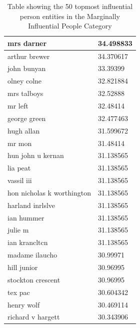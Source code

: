 \documentclass[letterpaper,11pt]{report}
\begin{document}
\begin{table}[h]
\begin{tabular}{|l|l|}
mrs darner                 & 34.498833 \\ \hline
arthur brewer              & 34.370617 \\ \hline
john bunyan                & 33.39399  \\ \hline
olney colne                & 32.821884 \\ \hline
mrs talboys                & 32.52888  \\ \hline
mr left                    & 32.48414  \\ \hline
george green               & 32.477463 \\ \hline
hugh allan                 & 31.599672 \\ \hline
mr mon                     & 31.48414  \\ \hline
hun john u kernan          & 31.138565 \\ \hline
lia peat                   & 31.138565 \\ \hline
vassil iii                 & 31.138565 \\ \hline
hon nicholas k worthington & 31.138565 \\ \hline
harland inrlslve           & 31.138565 \\ \hline
ian hummer                 & 31.138565 \\ \hline
julie m                    & 31.138565 \\ \hline
ian krancltcn              & 31.138565 \\ \hline
madame ilaucho             & 30.99971  \\ \hline
hill junior                & 30.96995  \\ \hline
stockton crescent          & 30.96995  \\ \hline
tex pac                    & 30.604342 \\ \hline
henry wolf                 & 30.469114 \\ \hline
richard v hargett          & 30.343906 \\ \hline
\end{tabular}
\caption{Table showing the 50 topmost influential person entities in the Marginally Influential People Category}
\label{table:app3}
\end{table}
\end{document}
